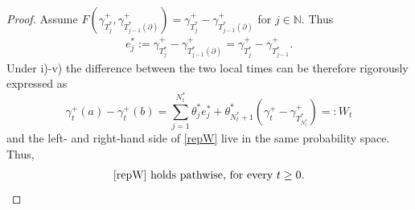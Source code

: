 \documentclass[10pt,a4paper]{article}
\numberwithin{equation}{section}
\theoremstyle{plain}
\theoremstyle{remark}
\begin{document}
\begin{proof}
Assume $F(\gamma^+_{T^*_j},\gamma^+_{T^*_{j-1}(\partial)})= \gamma^+_{T^*_j} - \gamma^+_{T^*_{j-1}(\partial)}$ for $j \in \mathbb{N}$. Thus
\begin{align*}
e^*_j :=\gamma^+_{T^*_j} - \gamma^+_{T^*_{j-1}(\partial)} = \gamma^+_{T^*_j} - \gamma^+_{T^*_{j-1}}.
\end{align*}
Under i)-v) the difference between the two local times can be therefore rigorously expressed as
\begin{equation}
\gamma^+_t(a) - \gamma^+_t(b) = \sum_{j=1}^{N^*_t} \theta^*_j e^*_j + \theta^*_{N^*_t+1} \left( \gamma^+_t - \gamma^+_{T^*_{N^*_t}} \right) =: W_t
\label{repW}
\end{equation}
and the left- and right-hand side of \eqref{repW} live in the same probability space. Thus,  
\begin{align*}
\textrm{\eqref{repW} holds pathwise, for every $t\geq 0$.}
\end{align*}


\end{proof}
\end{document}
